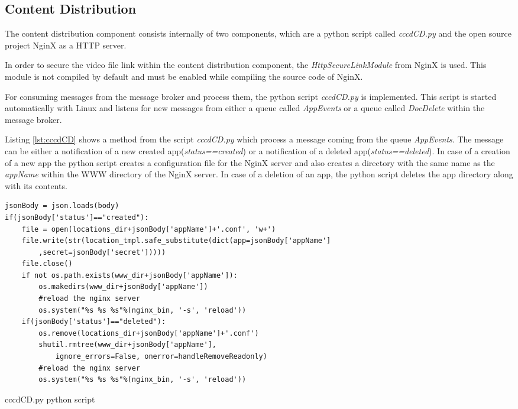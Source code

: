\subsection{Content Distribution\label{sec:impl_cdn}}
The content distribution component consists internally of two components, which are a python script called \textit{cccdCD.py} and the open source project NginX as a \ac{HTTP} server.

In order to secure the video file link within the content distribution component, the \textit{HttpSecureLinkModule} from NginX is used. This module is not compiled by default and must be enabled while compiling the source code of NginX.

For consuming messages from the message broker and process them, the python script \textit{cccdCD.py} is implemented. This script is started automatically with Linux and listens for new messages from either a queue called \textit{AppEvents} or a queue called \textit{DocDelete} within the message broker. %

Listing \ref{lst:cccdCD} shows a method from the script \textit{cccdCD.py} which process a message coming from the queue \textit{AppEvents}. The message can be either a notification of a new created app(\textit{status==created}) or a notification of a deleted app(\textit{status==deleted}). In case of a creation of a new app the python script creates a configuration file for the NginX server and also creates a directory with the same name as the \textit{appName} within the WWW directory of the NginX server. In case of a deletion of an app, the python script deletes the app directory along with its contents.
\pagebreak

\begin{code}
\begin{verbatim}
jsonBody = json.loads(body)
if(jsonBody['status']=="created"):
	file = open(locations_dir+jsonBody['appName']+'.conf', 'w+')
	file.write(str(location_tmpl.safe_substitute(dict(app=jsonBody['appName']
		,secret=jsonBody['secret']))))
	file.close()
	if not os.path.exists(www_dir+jsonBody['appName']):
		os.makedirs(www_dir+jsonBody['appName'])
		#reload the nginx server
		os.system("%s %s %s"%(nginx_bin, '-s', 'reload'))
	if(jsonBody['status']=="deleted"):
		os.remove(locations_dir+jsonBody['appName']+'.conf')
		shutil.rmtree(www_dir+jsonBody['appName'], 
			ignore_errors=False, onerror=handleRemoveReadonly)
		#reload the nginx server
		os.system("%s %s %s"%(nginx_bin, '-s', 'reload'))
\end{verbatim}
\caption{cccdCD.py python script}
\label{lst:cccdCD}
\end{code}

